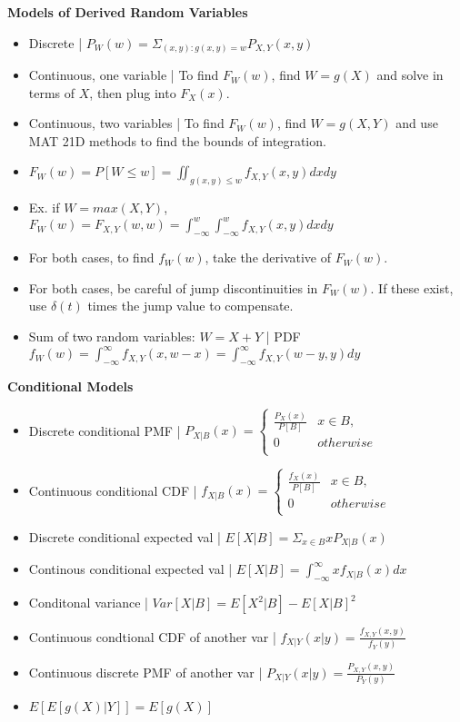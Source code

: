 \documentclass[8pt]{article}
\begin{document}
\textbf{Models of Derived Random Variables}
\begin{itemize}
    \item Discrete | $P_W(w) = \Sigma_{(x, y): g(x,y) = w} P_{X,Y}(x, y)$
    \item Continuous, one variable | To find $F_W(w)$, find $W = g(X)$ and solve in terms of $X$, then plug into $F_X(x)$.
    \item Continuous, two variables | To find $F_W(w)$, find $W = g(X, Y)$ and use MAT 21D methods to find the bounds of integration.
    \item $F_W(w) = P[W \leq w] = \iint_{g(x,y) \leq w} f_{X,Y}(x, y) dx dy$
    \item Ex. if $W = max(X, Y)$, $F_W(w) = F_{X,Y}(w, w) = \int_{-\infty}^w \int_{-\infty}^w f_{X,Y}(x, y) dx dy$
    \item For both cases, to find $f_W(w)$, take the derivative of $F_W(w)$.
    \item For both cases, be careful of jump discontinuities in $F_W(w)$. If these exist, use $\delta(t)$ times the jump value to compensate.
    \item Sum of two random variables: $W = X + Y$ | PDF $f_W(w) = \int_{-\infty}^\infty f_{X,Y}(x, w - x) = \int_{-\infty}^\infty f_{X,Y}(w - y, y) dy$
\end{itemize}
\textbf{Conditional Models}
\begin{itemize}
    \item Discrete conditional PMF | $P_{X|B}(x) = \begin{cases}
        \frac{P_X(x)}{P[B]} & x \in B, \\
        0 & otherwise \\
    \end{cases}$
    \item Continuous conditional CDF | $f_{X|B}(x) = \begin{cases}
        \frac{f_X(x)}{P[B]} & x \in B, \\
        0 & otherwise \\
    \end{cases}$
    \item Discrete conditional expected val | $E[X|B] = \Sigma_{x \in B} xP_{X|B}(x)$
    \item Continous conditional expected val | $E[X|B] = \int_{-\infty}^\infty xf_{X|B}(x)dx$
    \item Conditonal variance | $Var[X|B] = E[X^2|B] - E[X|B]^2$
    \item Continuous condtional CDF of another var | $f_{X|Y}(x|y) = \frac{f_{X,Y}(x, y)}{f_Y(y)}$
    \item Continuous discrete PMF of another var | $P_{X|Y}(x|y) = \frac{P_{X,Y}(x, y)}{P_Y(y)}$
    \item $E[E[g(X)|Y]] = E[g(X)]$
\end{itemize}
\end{document}
